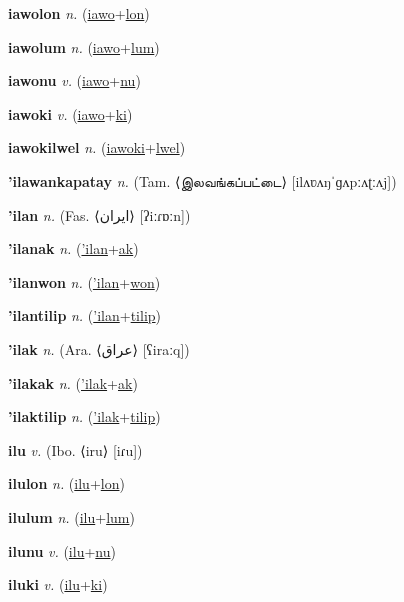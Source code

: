 \textbf{\hypertarget{iawolon}{iawolon}} \textit{n.} (\hyperlink{iawo}{iawo}+\allowbreak \hyperlink{lon}{lon})


\textbf{\hypertarget{iawolum}{iawolum}} \textit{n.} (\hyperlink{iawo}{iawo}+\allowbreak \hyperlink{lum}{lum})


\textbf{\hypertarget{iawonu}{iawonu}} \textit{v.} (\hyperlink{iawo}{iawo}+\allowbreak \hyperlink{nu}{nu})


\textbf{\hypertarget{iawoki}{iawoki}} \textit{v.} (\hyperlink{iawo}{iawo}+\allowbreak \hyperlink{ki}{ki})


\textbf{\hypertarget{iawokilwel}{iawokilwel}} \textit{n.} (\hyperlink{iawoki}{iawoki}+\allowbreak \hyperlink{lwel}{lwel})


\textbf{\hypertarget{'ilawankapatay}{'ilawankapatay}} \textit{n.} (Tam. ⟨{\tamil{}இலவங்கப்பட்டை}⟩ [ilʌʋʌŋˈɡʌpːʌʈːʌj])


\textbf{\hypertarget{'ilan}{'ilan}} \textit{n.} (Fas. ⟨{\arabics{}ایران‎}⟩ [ʔiːɾɒːn])


\textbf{\hypertarget{'ilanak}{'ilanak}} \textit{n.} (\hyperlink{'ilan}{'ilan}+\allowbreak \hyperlink{ak}{ak})


\textbf{\hypertarget{'ilanwon}{'ilanwon}} \textit{n.} (\hyperlink{'ilan}{'ilan}+\allowbreak \hyperlink{won}{won})


\textbf{\hypertarget{'ilantilip}{'ilantilip}} \textit{n.} (\hyperlink{'ilan}{'ilan}+\allowbreak \hyperlink{tilip}{tilip})


\textbf{\hypertarget{'ilak}{'ilak}} \textit{n.} (Ara. ⟨{\arabics{}عراق}⟩ [ʕiraːq])


\textbf{\hypertarget{'ilakak}{'ilakak}} \textit{n.} (\hyperlink{'ilak}{'ilak}+\allowbreak \hyperlink{ak}{ak})


\textbf{\hypertarget{'ilaktilip}{'ilaktilip}} \textit{n.} (\hyperlink{'ilak}{'ilak}+\allowbreak \hyperlink{tilip}{tilip})


\textbf{\hypertarget{ilu}{ilu}} \textit{v.} (Ibo. ⟨iru⟩ [iɾu])


\textbf{\hypertarget{ilulon}{ilulon}} \textit{n.} (\hyperlink{ilu}{ilu}+\allowbreak \hyperlink{lon}{lon})


\textbf{\hypertarget{ilulum}{ilulum}} \textit{n.} (\hyperlink{ilu}{ilu}+\allowbreak \hyperlink{lum}{lum})


\textbf{\hypertarget{ilunu}{ilunu}} \textit{v.} (\hyperlink{ilu}{ilu}+\allowbreak \hyperlink{nu}{nu})


\textbf{\hypertarget{iluki}{iluki}} \textit{v.} (\hyperlink{ilu}{ilu}+\allowbreak \hyperlink{ki}{ki})


